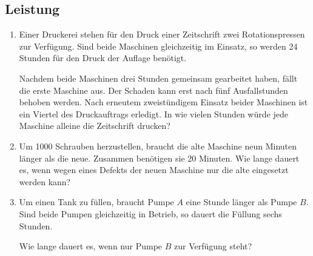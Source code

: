 \subsection{Leistung}
\begin{enumerate}[label=\alph*)]
\item
Einer Druckerei stehen für den Druck einer Zeitschrift zwei
Rotationspressen zur Verfügung. Sind beide Maschinen gleichzeitig im
Einsatz, so werden 24 Stunden für den Druck der Auflage benötigt.

Nachdem beide Maschinen drei Stunden gemeinsam gearbeitet haben, fällt
die erste Maschine aus. Der Schaden kann erst nach fünf Ausfallstunden
behoben werden. Nach erneutem zweistündigem Einsatz beider Maschinen
ist ein Viertel des Druckauftrags erledigt. In wie vielen Stunden
würde jede Maschine alleine die Zeitschrift drucken?

\item
Um 1000 Schrauben herzustellen, braucht die alte Maschine neun Minuten
länger als die neue. Zusammen benötigen sie 20 Minuten. Wie lange
dauert es, wenn wegen eines Defekts der neuen Maschine nur die alte
eingesetzt werden kann?

\item
Um einen Tank zu füllen, braucht Pumpe $A$ eine Stunde länger als
Pumpe $B$. Sind beide Pumpen gleichzeitig in Betrieb, so dauert die
Füllung sechs Stunden.

Wie lange dauert es, wenn nur Pumpe $B$ zur Verfügung steht?


\end{enumerate}
\newpage
